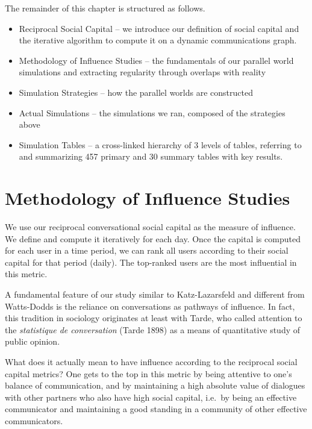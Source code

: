 \documentclass[10pt,oneside]{memoir}
\begin{document}
The remainder of this chapter is structured as follows.


\begin{itemize}


\item Reciprocal Social Capital -- we introduce our definition of social capital and the iterative algorithm to compute it on a dynamic communications graph.

\item Methodology of Influence Studies -- the fundamentals of our parallel world simulations and extracting regularity through overlaps with reality

\item Simulation Strategies -- how the parallel worlds are constructed

\item Actual Simulations -- the simulations we ran, composed of the strategies above

\item Simulation Tables -- a cross-linked hierarchy of 3 levels of tables, referring to and summarizing 457 primary and 30 summary tables with key results.
\end{itemize}

\pagebreak \section{Methodology of Influence Studies}
\label{methodologyofinfluencestudies}

We use our reciprocal conversational social capital as the measure of influence.  We define and compute it iteratively for each day.  Once the capital is computed for each user in a time period,  we can rank all users according to their social capital for that period (daily).  The top-ranked users are the most influential in this metric.


A fundamental feature of our study similar to Katz-Lazarsfeld and different from Watts-Dodds is the reliance on conversations as pathways of influence.  In fact, this tradition in sociology originates at least with Tarde, who called attention to  the \emph{statistique de conversation} (Tarde 1898) \cite{tarde1969communication} as a means of quantitative study of public opinion.


What does it actually mean to have influence according to the reciprocal social capital metrics?  One gets to the top in this metric by being attentive to one's balance of communication, and by maintaining a high absolute value of dialogues with other partners who also have high social capital, i.e.\ by being an effective communicator and maintaining a good standing in a community of other effective communicators.
\end{document}
